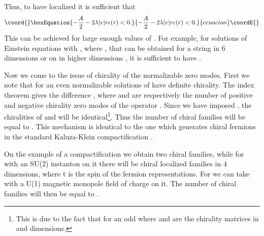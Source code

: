 \documentclass[a4paper,12pt]{article}
\begin{document}
Thus, to have localized \coordHE{} it is sufficient that
\begin{equation}\coord{}\boxEquation{
\label{eq14}
-{A\over 2}-2\lambda|v|r\epsilon(r)<0.
}{
-{A\over 2}-2\lambda|v|r\epsilon(r)<0.
}{ecuacion}\coordE{}\end{equation}
This can be achieved for large enough values of \coordHE{}. For
example, for solutions of Einstein equations with  \coordHE{},  where \coordHE{}, that can be obtained for a string in 6
dimensions \cite{gs} or on \coordHE{} in higher dimensions \cite{grs},
it is sufficient to have \coordHE{}. 

Now we come to the issue of chirality of the normalizable zero modes.
First we note that for an even \coordHE{} normalizable solutions of 
\coordHE{} have definite chirality. The
index theorem gives the difference \coordHE{}, where \coordHE{} and \coordHE{}
are respectively the number of positive and negative chirality zero
modes of the operator \coordHE{}. Since we have
imposed \coordHE{}, the chiralities of \coordHE{} and \coordHE{}
will be identical\footnote{This is due to the fact that for an odd
\coordHE{}  \coordHE{} where \coordHE{}
and \coordHE{} are the chirality matrices in \coordHE{} and \coordHE{}
dimensions.}. Thus the number of chiral families will be equal to
\coordHE{}. This mechanism is identical to the one which generates
chiral fermions in the standard Kaluza-Klein compactification
\cite{seif1}.

On the example of a  \coordHE{} compactification we obtain two chiral
families, while for \coordHE{} with an SU(2) instanton on it there will
be  \coordHE{} chiral localized families in 4
dimensions,  where t is the spin of the fermion representations. For
\coordHE{} we can take \coordHE{} with a U(1) magnetic monopole field of
charge \coordHE{} on it. The number of chiral families will then be equal to
\coordHE{} \cite{seif2}.
\end{document}
